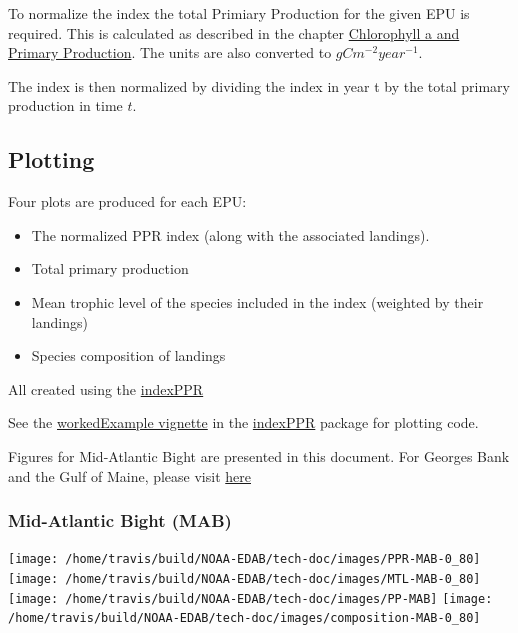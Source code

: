 \documentclass[
]{book}
\providecommand{\tightlist}{%
  \setlength{\itemsep}{0pt}\setlength{\parskip}{0pt}}
\begin{document}
To normalize the index the total Primiary Production for the given EPU is required. This is calculated as described in the chapter \href{https://noaa-edab.github.io/tech-doc/chl-pp.html}{Chlorophyll a and Primary Production}. The units are also converted to \(gCm^{-2}year^{-1}\).

The index is then normalized by dividing the index in year t by the total primary production in time \(t\).

\hypertarget{plotting-20}{%
\subsection{Plotting}\label{plotting-20}}

Four plots are produced for each EPU:

\begin{itemize}
\tightlist
\item
  The normalized PPR index (along with the associated landings).
\item
  Total primary production
\item
  Mean trophic level of the species included in the index (weighted by their landings)
\item
  Species composition of landings
\end{itemize}

All created using the \href{https://github.com/andybeet/indexPPR}{indexPPR}

See the \href{https://github.com/andybeet/indexPPR/tree/master/vignettes}{workedExample vignette} in the \href{https://github.com/andybeet/indexPPR/}{indexPPR} package for plotting code.

Figures for Mid-Atlantic Bight are presented in this document. For Georges Bank and the Gulf of Maine, please visit \href{(https://github.com/andybeet/indexPPR/tree/master/vignettes/figures)}{here}

\hypertarget{mid-atlantic-bight-mab}{%
\subsubsection{Mid-Atlantic Bight (MAB)}\label{mid-atlantic-bight-mab}}

\texttt{[image: /home/travis/build/NOAA-EDAB/tech-doc/images/PPR-MAB-0\_80]}
\texttt{[image: /home/travis/build/NOAA-EDAB/tech-doc/images/MTL-MAB-0\_80]}
\texttt{[image: /home/travis/build/NOAA-EDAB/tech-doc/images/PP-MAB]}
\texttt{[image: /home/travis/build/NOAA-EDAB/tech-doc/images/composition-MAB-0\_80]}
\end{document}
